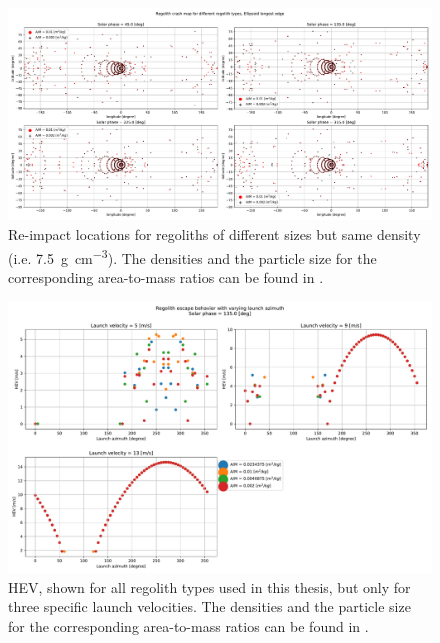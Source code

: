 \documentclass[print]{tudelft-report}
\begin{document}
\begin{appendices}
\begin{figure}[htb]
    \includegraphics[angle=90, width=\textwidth, height=\textheight, keepaspectratio=true]{Results/Images/longest_edge_perturbations/multiple_regolith_types/allPhases_crashMap_7P5_density_1cm_5cm_Radius.pdf}
    \caption{Re-impact locations for regoliths of different sizes but same density (i.e. \SI{7.5}{\gram\per\centi\metre\cubed}). The densities and the particle size for the corresponding area-to-mass ratios can be found in .}
    \label{fig:crashmap_7.5_density_1cm_5cmRadius}
    \end{figure}
    \FloatBarrier
    \begin{figure}[htb]
    \centering
    \captionsetup{justification=centering}
    \includegraphics[width=\textwidth, height=0.5\textheight, keepaspectratio=true]{Results/Images/longest_edge_perturbations/multiple_regolith_types/phase135_escapeHEV.pdf}
    \caption{\gls{HEV}, shown for all regolith types used in this thesis, but only for three specific launch velocities. The densities and the particle size for the corresponding area-to-mass ratios can be found in .}

\end{figure}
\end{appendices}
\end{document}
